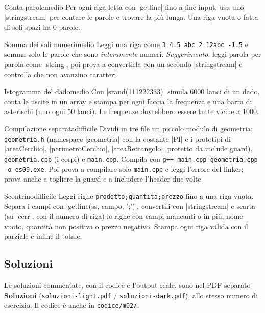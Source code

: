 \begin{esercizio}{Conta parole}{medio}
Per ogni riga letta con \cc|getline| fino a fine input, usa uno
\cc|stringstream| per contare le parole e trovare la più lunga. Una riga vuota o
fatta di soli spazi ha 0 parole.
\end{esercizio}

\begin{esercizio}{Somma dei soli numeri}{medio}
Leggi una riga come \texttt{3 4.5 abc 2 12abc -1.5} e somma solo le parole che
sono \emph{interamente} numeri. \emph{Suggerimento}: leggi parola per parola
come \cc|string|, poi prova a convertirla con un secondo \cc|stringstream| e
controlla che non avanzino caratteri.
\end{esercizio}

\begin{esercizio}{Istogramma del dado}{medio}
Con \cc|srand(111222333)| simula 6000 lanci di un dado, conta le uscite in un
array e stampa per ogni faccia la frequenza e una barra di asterischi (uno ogni
50 lanci). Le frequenze dovrebbero essere tutte vicine a 1000.
\end{esercizio}

\begin{esercizio}{Compilazione separata}{difficile}
Dividi in tre file un piccolo modulo di geometria: \texttt{geometria.h}
(namespace \cc|geometria| con la costante \cc|PI| e i prototipi di
\cc|areaCerchio|, \cc|perimetroCerchio|, \cc|areaRettangolo|, protetto da
include guard), \texttt{geometria.cpp} (i corpi) e \texttt{main.cpp}.
Compila con \texttt{g++ main.cpp geometria.cpp -o es09.exe}. Poi prova a
compilare solo \texttt{main.cpp} e leggi l'errore del linker; prova anche a
togliere la guard e a includere l'header due volte.
\end{esercizio}

\begin{esercizio}{Scontrino}{difficile}
Leggi righe \texttt{prodotto;quantita;prezzo} fino a una riga vuota.
Separa i campi con \cc|getline(ss, campo, ';')|, convertili con
\cc|stringstream| e scarta (su \cc|cerr|, con il numero di riga) le righe con
campi mancanti o in più, nome vuoto, quantità non positiva o prezzo negativo.
Stampa ogni riga valida con il parziale e infine il totale.
\end{esercizio}

\subsection*{Soluzioni}
Le soluzioni commentate, con il codice e l'output reale, sono nel PDF separato
\textbf{Soluzioni} (\texttt{soluzioni-light.pdf} / \texttt{soluzioni-dark.pdf}),
allo stesso numero di esercizio. Il codice è anche in \texttt{codice/m02/}.
